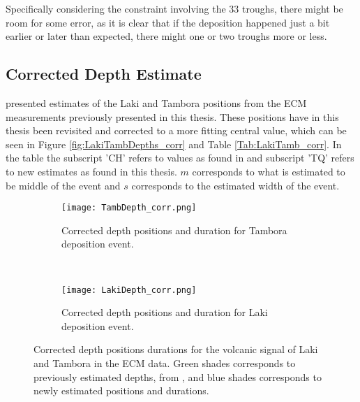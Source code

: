 \documentclass[../../CompleteThesis2/Complete_2ndDraft]{subfiles}
\begin{document}
Specifically considering the constraint involving the 33 troughs, there might be room for some error, as it is clear that if the deposition happened just a bit earlier or later than expected, there might one or two troughs more or less. 

\subsection[Corrected Depth]{Corrected Depth Estimate}
\label{Subsec:Data_VolcanicHorizons_CorrDepthEst}

\cite[Clausen \& Hammer, 1988]{ClausenHammer1988} presented estimates of the Laki and Tambora positions from the ECM measurements previously presented in this thesis. These positions have in this thesis been revisited and corrected to a more fitting central value, which can be seen in Figure \ref{fig:LakiTambDepths_corr} and Table \ref{Tab:LakiTamb_corr}. In the table the subscript 'CH' refers to values as found in \cite[Clausen \& Hammer, 1988]{ClausenHammer1988} and subscript 'TQ' refers to new estimates as found in this thesis. $m$ corresponds to what is estimated to be middle of the event and $s$ corresponds to the estimated width of the event.

\begin{figure}[h]
	\centering
	\begin{subfigure}{.45\textwidth}
		\centering
		\texttt{[image: TambDepth\_corr.png]}
		\caption{\footnotesize Corrected depth positions and duration for Tambora deposition event.}
		\label{fig:DATA_TambDepth_corr}
	\end{subfigure}
	~
	\begin{subfigure}{.45\textwidth}
		\centering
		\texttt{[image: LakiDepth\_corr.png]}
		\caption{\footnotesize Corrected depth positions and duration for Laki deposition event.}
		\label{fig:DATA_LakiDepth_corr}
	\end{subfigure}
	\caption{\footnotesize Corrected depth positions durations for the volcanic signal of Laki and Tambora in the ECM data. Green shades corresponds to previously estimated depths, from \cite[Clausen \& Hammer, 1988]{ClausenHammer1988}, and blue shades corresponds to newly estimated positions and durations.}
	\label{fig:DATA_LakiTambDepths_corr}
\end{figure}
\end{document}
